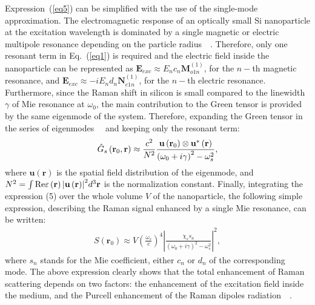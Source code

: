             Expression~(\ref{eq5}) can be simplified with the use of the single-mode approximation. The
        electromagnetic response of an optically small Si nanoparticle at the excitation wavelength is dominated by a single
        magnetic or electric multipole resonance depending on the particle radius~~\cite{evlyukhin2010optical}. Therefore,
        only one resonant term in Eq.~(\ref{eq1}) is required and the electric field inside the nanoparticle can be represented as ${
        {\mathbf{{E}}}_{exc}} \approx {E_n}{c_n}{\mathbf{M}}_{o1n}^{(1)}$, for the $n-$th magnetic resonance, and
        ${{\mathbf{{E}}}_{exc}}\approx -i{E_n}{d_n}{\mathbf{N}}_{e1n}^{(1)}$, for the $n-$th electric resonance.
        Furthermore, since the Raman shift in silicon is small compared to the linewidth $\gamma$ of
        Mie resonance at $\omega_0$, the main contribution to the Green tensor is provided by the same eigenmode of
        the system. Therefore, expanding the Green tensor in the series of eigenmodes~~\cite{ishimaru1991electromagnetic} and keeping only
        the resonant term:
        \begin{align}
            {\hat G_s}\left( {{{\bf{r}}_0},{\bf{r}}} \right) \approx \frac{{{c^2}}}{{{N^2}}}\frac{{{\bf{u}}\left( {{{\bf{r}}_0}} \right) \otimes
            {\bf{u}}^*\left( {\bf{r}} \right)}}{{{{\left( {{\omega _0} + i\gamma } \right)}^2} - \omega _s^2}},
            \label{eq8}
        \end{align}
        where ${{\mathbf{u}}\left( {{\mathbf r}} \right)}$ is the spatial field distribution of the eigenmode, and
        ${N^2} = {\int {{\mathop{\rm Re}\nolimits} \varepsilon \left( {\bf{r}} \right)\left| {{\bf{u}}\left( {\bf{r}} \right)} \right|} ^2}{d^3}{\bf{r}}$
        is the normalization constant. Finally, integrating the expression (5) over the whole volume $V$ of the nanoparticle,
        the following simple expression, describing the Raman signal enhanced by a single Mie resonance, can be written:
        \begin{align}
            S\left( {{{\mathbf{r}}_0}} \right) \approx V{\left( {\frac{{{\omega _s}}}{c}} \right)^4}{\left| {\frac{{{\chi_s s_n}}}{{{{\left( {{\omega
            _0} + i\gamma } \right)}^2} - \omega _s^2}}} \right|^2},
            \label{eq9}
        \end{align}
        where $s_n$ stands for the Mie coefficient, either $c_n$ or $d_n$ of the corresponding mode. The above expression clearly
        shows that the total enhancement of Raman scattering depends on two factors: the enhancement of the excitation field
        inside the medium, and the Purcell enhancement of the Raman dipoles radiation~~\cite{checoury2010deterministic}.

